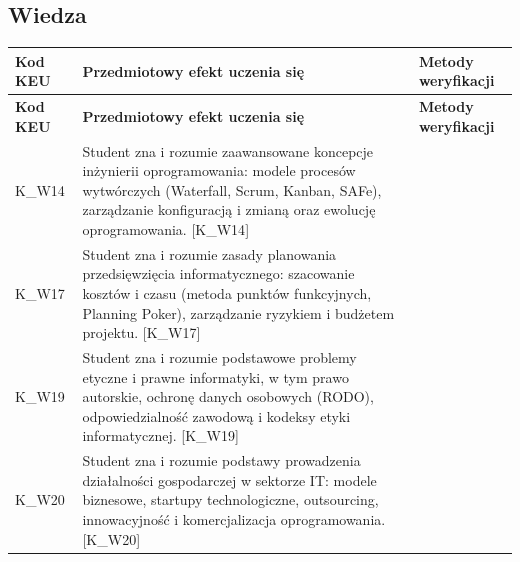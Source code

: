 \documentclass[12pt, a4paper]{article}
\newcommand{\thdrule}{\noalign{\global\setlength{\extrarowheight}{0pt}}}
\newcommand{\thdend}{\noalign{\global\setlength{\extrarowheight}{3pt}}}
\begin{document}
\subsection*{Wiedza}
{\scriptsize
\begin{longtable}{m{1.6cm}m{9.0cm}m{4.2cm}}
\thdrule\toprule
\rowcolor{pjatkRed} {\color{white}\footnotesize\textbf{\vphantom{Ag}Kod KEU}} & {\color{white}\footnotesize\textbf{\vphantom{Ag}Przedmiotowy efekt uczenia się}} & {\color{white}\footnotesize\textbf{\vphantom{Ag}Metody weryfikacji}} \\
\midrule\thdend
\endfirsthead
\thdrule\toprule
\rowcolor{pjatkRed} {\color{white}\footnotesize\textbf{\vphantom{Ag}Kod KEU}} & {\color{white}\footnotesize\textbf{\vphantom{Ag}Przedmiotowy efekt uczenia się}} & {\color{white}\footnotesize\textbf{\vphantom{Ag}Metody weryfikacji}} \\
\midrule\thdend
\endhead
  \rowcolor{tableRowLight} K\_W14 & Student zna i rozumie zaawansowane koncepcje inżynierii oprogramowania: modele procesów wytwórczych (Waterfall, Scrum, Kanban, SAFe), zarządzanie konfiguracją i zmianą oraz ewolucję oprogramowania. {[}K\_W14{]} &  \\
  \rowcolor{tableRowAlt} K\_W17 & Student zna i rozumie zasady planowania przedsięwzięcia informatycznego: szacowanie kosztów i czasu (metoda punktów funkcyjnych, Planning Poker), zarządzanie ryzykiem i budżetem projektu. {[}K\_W17{]} &  \\
  \rowcolor{tableRowLight} K\_W19 & Student zna i rozumie podstawowe problemy etyczne i prawne informatyki, w tym prawo autorskie, ochronę danych osobowych (RODO), odpowiedzialność zawodową i kodeksy etyki informatycznej. {[}K\_W19{]} &  \\
  \rowcolor{tableRowAlt} K\_W20 & Student zna i rozumie podstawy prowadzenia działalności gospodarczej w sektorze IT: modele biznesowe, startupy technologiczne, outsourcing, innowacyjność i komercjalizacja oprogramowania. {[}K\_W20{]} &  \\
\bottomrule
\end{longtable}}
\end{document}
